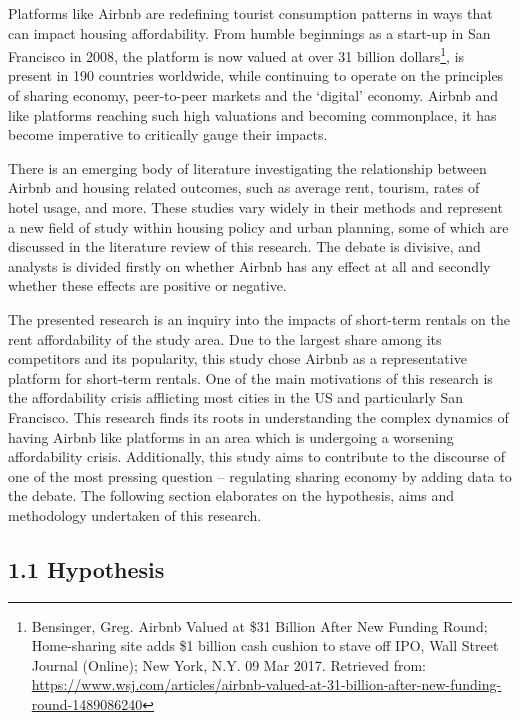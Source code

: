 \documentclass[10pt,letterpaper,onecolumn]{article}
\begin{document}
Platforms like Airbnb are redefining tourist consumption patterns in
ways that can impact housing affordability. From humble beginnings as a
start-up in San Francisco in 2008, the platform is now valued at over 31
billion dollars\footnote{Bensinger, Greg. Airbnb Valued at \$31 Billion
  After New Funding Round; Home-sharing site adds \$1 billion cash
  cushion to stave off IPO, Wall Street Journal (Online); New York, N.Y.
  09 Mar 2017. Retrieved from:
  \url{https://www.wsj.com/articles/airbnb-valued-at-31-billion-after-new-funding-round-1489086240}},
is present in 190 countries worldwide, while continuing to operate on
the principles of sharing economy, peer-to-peer markets and the
`digital' economy. Airbnb and like platforms reaching such high
valuations and becoming commonplace, it has become imperative to
critically gauge their impacts.

There is an emerging body of literature investigating the relationship
between Airbnb and housing related outcomes, such as average rent,
tourism, rates of hotel usage, and more. These studies vary widely in
their methods and represent a new field of study within housing policy
and urban planning, some of which are discussed in the literature review
of this research. The debate is divisive, and analysts is divided
firstly on whether Airbnb has any effect at all and secondly whether
these effects are positive or negative.

The presented research is an inquiry into the impacts of short-term
rentals on the rent affordability of the study area. Due to the largest
share among its competitors and its popularity, this study chose Airbnb
as a representative platform for short-term rentals. One of the main
motivations of this research is the affordability crisis afflicting most
cities in the US and particularly San Francisco. This research finds its
roots in understanding the complex dynamics of having Airbnb like
platforms in an area which is undergoing a worsening affordability
crisis. Additionally, this study aims to contribute to the discourse of
one of the most pressing question -- regulating sharing economy by
adding data to the debate. The following section elaborates on the
hypothesis, aims and methodology undertaken of this research.

\subsection*{1.1 Hypothesis}\label{subsec: hypothesis}
\end{document}
